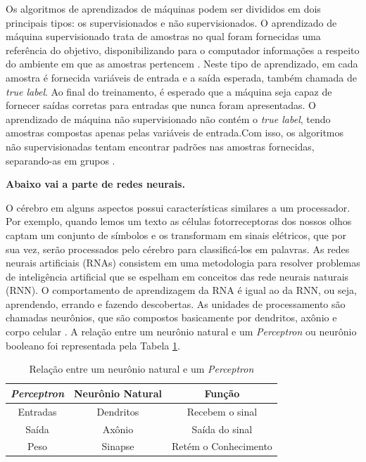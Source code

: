 \documentclass[conference]{IEEEtran}
\begin{document}
Os algoritmos de aprendizados de máquinas podem ser divididos em dois principais tipos: os supervisionados e não supervisionados. O aprendizado de máquina supervisionado trata de amostras no qual foram fornecidas uma referência do objetivo, disponibilizando para o computador informações a respeito do ambiente em que as amostras pertencem \cite{marr2017}. Neste tipo de aprendizado, em cada amostra é fornecida variáveis de entrada e a saída esperada, também chamada de \textit{true label}. Ao final do treinamento, é esperado que a máquina seja capaz de fornecer saídas corretas para entradas que nunca foram apresentadas. O aprendizado de máquina não supervisionado não contém o \textit{true label}, tendo amostras compostas apenas pelas variáveis de entrada.Com isso, os algoritmos não supervisionadas tentam encontrar padrões nas amostras fornecidas, separando-as em grupos \cite{marr2017}.

\textbf{Abaixo vai a parte de redes neurais.}

O cérebro em alguns aspectos possui características similares a um processador. Por exemplo, quando lemos um texto as células fotorreceptoras dos nossos olhos captam um conjunto de símbolos e os transformam em sinais elétricos, que por sua vez, serão processados pelo cérebro para classificá-los em palavras. As redes neurais artificiais (RNAs) consistem em uma metodologia para resolver problemas de inteligência artificial que se espelham em conceitos das rede neurais naturais (RNN). O comportamento de aprendizagem da RNA é igual ao da RNN, ou seja, aprendendo, errando e fazendo descobertas. As unidades de processamento são chamadas neurônios, que são compostos basicamente por dendritos, axônio e corpo celular \cite{kovacs96}. A relação entre um neurônio natural e um \textit{Perceptron} ou neurônio booleano foi representada pela Tabela \ref{table:tabelaComparativaNeuronioPerceptron}.

\renewcommand\tablename{TABELA}
\begin{table}[!h]
	\renewcommand{\arraystretch}{1.3}
	\caption{Relação entre um neurônio natural e um \textit{Perceptron}}
	\label{table:tabelaComparativaNeuronioPerceptron}
	\centering
	\begin{tabular}{|c|c|c|}
		\hline
		\textbf{\textit{Perceptron}} & \textbf{Neurônio Natural} & \textbf{Função}\\
		\hline
		Entradas & Dendritos & Recebem o sinal \\		
		\hline
		Saída & Axônio & Saída do sinal \\		
		\hline
		Peso & Sinapse & Retém o Conhecimento \\		
		\hline
	\end{tabular}
\end{table}
\end{document}
